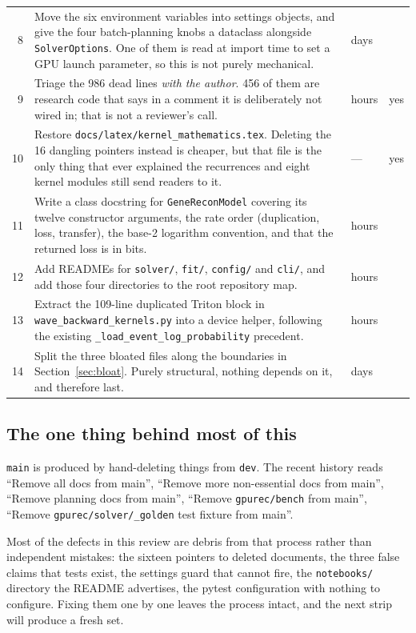 \documentclass[11pt]{article}
\newcommand{\dir}[1]{\nolinkurl{#1}}
\begin{document}
\begin{center}
\begin{longtable}{@{}rp{}ll@{}}
8 & Move the six environment variables into settings objects, and give the four
    batch-planning knobs a dataclass alongside \texttt{SolverOptions}.  One of
    them is read at import time to set a GPU launch parameter, so this is not
    purely mechanical.
  & days & \\
9 & Triage the 986 dead lines \emph{with the author}.  456 of them are research
    code that says in a comment it is deliberately not wired in; that is not a
    reviewer's call.
  & hours & yes \\
10 & Restore \dir{docs/latex/kernel\_mathematics.tex}.  Deleting the 16 dangling
    pointers instead is cheaper, but that file is the only thing that ever
    explained the recurrences and eight kernel modules still send readers to it.
  & --- & yes \\
11 & Write a class docstring for \texttt{GeneReconModel} covering its twelve
    constructor arguments, the rate order (duplication, loss, transfer), the
    base-2 logarithm convention, and that the returned loss is in bits.
  & hours & \\
12 & Add READMEs for \dir{solver/}, \dir{fit/}, \dir{config/} and \dir{cli/},
    and add those four directories to the root repository map.
  & hours & \\
13 & Extract the 109-line duplicated Triton block in
    \dir{wave\_backward\_kernels.py} into a device helper, following the
    existing \texttt{\_load\_event\_log\_probability} precedent.
  & hours & \\
14 & Split the three bloated files along the boundaries in
    Section~\ref{sec:bloat}.  Purely structural, nothing depends on it, and
    therefore last.
  & days & \\
\bottomrule
\end{longtable}
\end{center}

\subsection*{The one thing behind most of this}
\label{sec:rootcause}

\texttt{main} is produced by hand-deleting things from \texttt{dev}.  The recent
history reads ``Remove all docs from main'', ``Remove more non-essential docs
from main'', ``Remove planning docs from main'', ``Remove \dir{gpurec/bench}
from main'', ``Remove \dir{gpurec/solver/\_golden} test fixture from main''.

Most of the defects in this review are debris from that process rather than
independent mistakes: the sixteen pointers to deleted documents, the three
false claims that tests exist, the settings guard that cannot fire, the
\dir{notebooks/} directory the README advertises, the pytest configuration with
nothing to configure.  Fixing them one by one leaves the process intact, and the
next strip will produce a fresh set.
\end{document}
